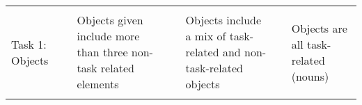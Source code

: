 \documentclass[]{article}
\begin{document}
\begin{longtable}[]{@{}lllllll@{}}
\begin{minipage}[t]{0.03\columnwidth}
\strut
\end{minipage} & \begin{minipage}[t]{0.19\columnwidth}\raggedright
\strut
\end{minipage} & \begin{minipage}[t]{0.03\columnwidth}\raggedright
\strut
\end{minipage} & \begin{minipage}[t]{0.20\columnwidth}\raggedright
\strut
\end{minipage}\tabularnewline
\begin{minipage}[t]{0.19\columnwidth}\raggedright
Task 1: Objects\strut
\end{minipage} & \begin{minipage}[t]{0.03\columnwidth}\raggedright
\strut
\end{minipage} & \begin{minipage}[t]{0.16\columnwidth}\raggedright
Objects given include more than three non-task related elements\strut
\end{minipage} & \begin{minipage}[t]{0.03\columnwidth}\raggedright
\strut
\end{minipage} & \begin{minipage}[t]{0.19\columnwidth}\raggedright
Objects include a mix of task-related and non-task-related objects\strut
\end{minipage} & \begin{minipage}[t]{0.03\columnwidth}\raggedright
\strut
\end{minipage} & \begin{minipage}[t]{0.20\columnwidth}\raggedright
Objects are all task-related (nouns)\strut
\end{minipage}\tabularnewline
\begin{minipage}[t]{0.19\columnwidth}\raggedright
\strut
\end{minipage} & \begin{minipage}[t]{0.03\columnwidth}\raggedright
\strut
\end{minipage} & \begin{minipage}[t]{0.16\columnwidth}\raggedright
\strut
\end{minipage} & \begin{minipage}[t]{0.03\columnwidth}\raggedright
\strut
\end{minipage} & \begin{minipage}[t]{0.19\columnwidth}\raggedright
\strut
\end{minipage} & \begin{minipage}[t]{0.03\columnwidth}\raggedright

\end{minipage}
\end{longtable}
\end{document}
